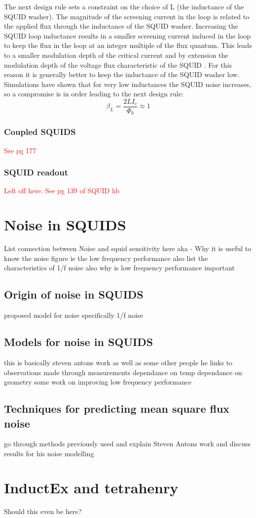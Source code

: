 The next design rule sets a constraint on the choice of L (the inductance of the SQUID washer). The magnitude of the screening current in the loop is related to the applied flux through the inductance of the SQUID washer. Increasing the SQUID loop inductance results in a smaller screening current induced in the loop to keep the flux in the loop at an integer multiple of the flux quantum. This leads to a smaller modulation depth of the critical current and by extension the modulation depth of the voltage flux characteristic of the SQUID \cite{Drung2016NBSQUIDS}. For this reason it is generally better to keep the inductance of the SQUID washer low. Simulations have shown that for very low inductances the SQUID noise increases, so a compromise is in order \cite{Drung2016NBSQUIDS} leading to the next design rule: 
\begin{equation}
    \beta_L = \frac{2LI_c}{\Phi_0} \approx 1
    \label{eq:SQUIDmodDepth}
\end{equation}

\subsubsection*{Coupled SQUIDS}
\textcolor{red}{See pg 177}

\subsubsection*{SQUID readout}
\textcolor{red}{Left off here. See pg 139 of SQUID hb}
\section{Noise in SQUIDS}

List connection between Noise and squid sensitivity here aka - Why it is useful to know the noise figure ie the low frequency performance also list the characteristics of 1/f noise also why is low frequency performance important

\subsection{Origin of noise in SQUIDS}
proposed model for noise specifically 1/f noise

\subsection{Models for noise in SQUIDS}
this is basically steven antons work as well as some other people he links to
observations made through measurements
dependance on temp
dependance on geometry 
some work on improving low frequency performance

\subsection{Techniques for predicting mean square flux noise}
go through methods previously used and explain Steven Antons work and discuss results for his noise modelling

\section{InductEx and tetrahenry}
Should this even be here?
